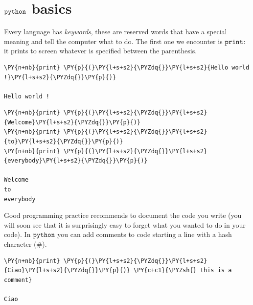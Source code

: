 \section{$\tt{python}$ basics}\label{python-basics}

Every language has \emph{keywords}, these are reserved words that have a special meaning and tell the computer what to do. The first one we encounter is \(\tt{print}\): it prints to screen whatever is specified between the parenthesis.

\begin{tcolorbox}[breakable, size=fbox, boxrule=1pt, pad at break*=1mm, colback=cellbackground, colframe=cellborder]
\begin{Verbatim}[commandchars=\\\{\}]
\PY{n+nb}{print} \PY{p}{(}\PY{l+s+s2}{\PYZdq{}}\PY{l+s+s2}{Hello world !}\PY{l+s+s2}{\PYZdq{}}\PY{p}{)} 

Hello world !
\end{Verbatim}
\end{tcolorbox}

\begin{tcolorbox}[breakable, size=fbox, boxrule=1pt, pad at break*=1mm, colback=cellbackground, colframe=cellborder]
\begin{Verbatim}[commandchars=\\\{\}]
\PY{n+nb}{print} \PY{p}{(}\PY{l+s+s2}{\PYZdq{}}\PY{l+s+s2}{Welcome}\PY{l+s+s2}{\PYZdq{}}\PY{p}{)}
\PY{n+nb}{print} \PY{p}{(}\PY{l+s+s2}{\PYZdq{}}\PY{l+s+s2}{to}\PY{l+s+s2}{\PYZdq{}}\PY{p}{)}
\PY{n+nb}{print} \PY{p}{(}\PY{l+s+s2}{\PYZdq{}}\PY{l+s+s2}{everybody}\PY{l+s+s2}{\PYZdq{}}\PY{p}{)}

Welcome
to
everybody
\end{Verbatim}
\end{tcolorbox}

Good programming practice recommends to document the code you write (you will soon see that it is surprisingly easy to forget what you wanted to do in your code). In \(\tt{python}\) you can add comments to code starting a line with a hash character (\#).

\begin{tcolorbox}[breakable, size=fbox, boxrule=1pt, pad at break*=1mm, colback=cellbackground, colframe=cellborder]
\begin{Verbatim}[commandchars=\\\{\}]
\PY{n+nb}{print} \PY{p}{(}\PY{l+s+s2}{\PYZdq{}}\PY{l+s+s2}{Ciao}\PY{l+s+s2}{\PYZdq{}}\PY{p}{)} \PY{c+c1}{\PYZsh{} this is a comment}

Ciao
\end{Verbatim}
\end{tcolorbox}

